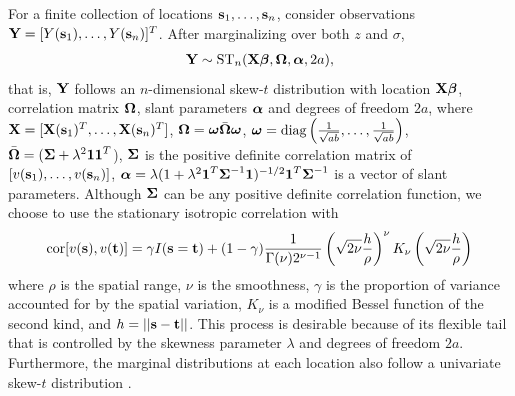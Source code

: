 \documentclass[11pt]{article}
\begin{document}
For a finite collection of locations $\mbox{\bf s}_1, \ldots, \mbox{\bf s}_n$, consider observations $\mbox{\bf Y} = [Y(\mbox{\bf s}_1), \ldots, Y(\mbox{\bf s}_n)]^T$.
After marginalizing over both $z$ and $\sigma$,
\begin{align}
  \mbox{\bf Y} \sim \text{ST}_n(\mbox{\bf X} \mbox{\boldmath $\beta$}, \mbox{\boldmath $\Omega$}, \mbox{\boldmath $\alpha$}, 2a), \label{eq:fullmodel}
\end{align}
that is, $\mbox{\bf Y}$ follows an $n$-dimensional skew-$t$ distribution with location $\mbox{\bf X} \mbox{\boldmath $\beta$}$, correlation matrix $\mbox{\boldmath $\Omega$}$, slant parameters $\mbox{\boldmath $\alpha$}$ and degrees of freedom $2a$, where $\mbox{\bf X} = [\mbox{\bf X}(\mbox{\bf s}_1)^T, \ldots, \mbox{\bf X}(\mbox{\bf s}_n)^T]$, $\mbox{\boldmath $\Omega$} = \mbox{\boldmath $\omega$} \bar{\mbox{\boldmath $\Omega$}} \mbox{\boldmath $\omega$}$, $\mbox{\boldmath $\omega$} = \text{diag}\left(\frac{1}{ \sqrt{ab}}, \ldots, \frac{1}{\sqrt{ab}}\right)$, $\bar{\mbox{\boldmath $\Omega$}} = (\mbox{\boldmath $\Sigma$} + \lambda^2 \mbox{\boldmath $1$} \mbox{\boldmath $1$}^T$), $\mbox{\boldmath $\Sigma$}$ is the positive definite correlation matrix of $[v(\mbox{\bf s}_1), \ldots, v(\mbox{\bf s}_n)]$, $\mbox{\boldmath $\alpha$} = \lambda (1 + \lambda^2 \mbox{\boldmath $1$}^T \mbox{\boldmath $\Sigma$}^{-1} \mbox{\boldmath $1$})^{-1/2} \mbox{\boldmath $1$}^T \mbox{\boldmath $\Sigma$}^{-1}$ is a vector of slant parameters.
Although $\mbox{\boldmath $\Sigma$}$ can be any positive definite correlation function, we choose to use the stationary isotropic \Matern correlation with
\begin{align}
  \text{cor}[v(\mbox{\bf s}), v(\mbox{\bf t})] = \gamma I(\mbox{\bf s} = \mbox{\bf t}) + (1 - \gamma)  \frac{ 1 }{ \Gamma(\nu) 2^{ \nu - 1}} \left( \sqrt{2\nu} \frac{ h }{ \rho } \right)^{\nu} K_{\nu} \left( \sqrt{2\nu} \frac{ h }{ \rho } \right) \label{eq:matern}
\end{align}
where $\rho$ is the spatial range, $\nu$ is the smoothness, $\gamma$ is the proportion of variance accounted for by the spatial variation, $K_\nu$ is a modified Bessel function of the second kind, and $h = || \mbox{\bf s} - \mbox{\bf t} ||$.
This process is desirable because of its flexible tail that is controlled by the skewness parameter $\lambda$ and degrees of freedom $2a$.
Furthermore, the marginal distributions at each location also follow a univariate skew-$t$ distribution \citep{Azzalini2014}.
\end{document}

